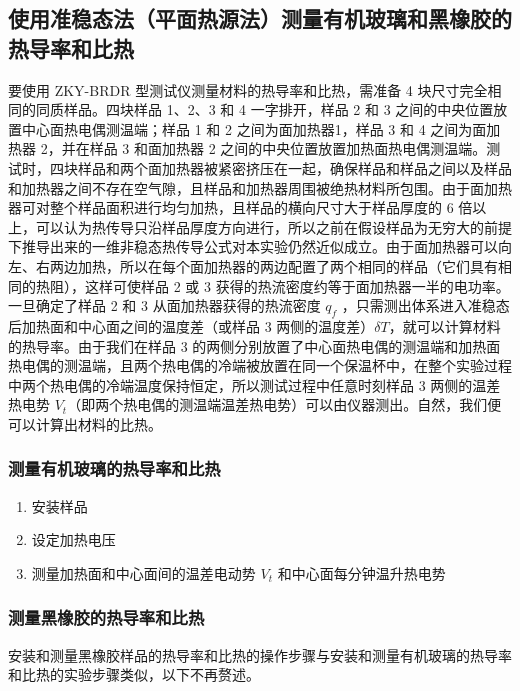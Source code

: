     \subsection{使用准稳态法（平面热源法）测量有机玻璃和黑橡胶的热导率和比热}
        要使用 ZKY-BRDR 型测试仪测量材料的热导率和比热，需准备 4 块尺寸完全相同的同质样品。四块样品 1、2、3 和 4 一字排开，样品 2 和 3 之间的中央位置放置中心面热电偶测温端；样品 1 和 2 之间为面加热器1，样品 3 和 4 之间为面加热器 2，并在样品 3 和面加热器 2 之间的中央位置放置加热面热电偶测温端。测试时，四块样品和两个面加热器被紧密挤压在一起，确保样品和样品之间以及样品和加热器之间不存在空气隙，且样品和加热器周围被绝热材料所包围。由于面加热器可对整个样品面积进行均匀加热，且样品的横向尺寸大于样品厚度的 6 倍以上，可以认为热传导只沿样品厚度方向进行，所以之前在假设样品为无穷大的前提下推导出来的一维非稳态热传导公式对本实验仍然近似成立。由于面加热器可以向左、右两边加热，所以在每个面加热器的两边配置了两个相同的样品（它们具有相同的热阻），这样可使样品 2 或 3 获得的热流密度约等于面加热器一半的电功率。一旦确定了样品 2 和 3 从面加热器获得的热流密度 $q_f$ ，只需测出体系进入准稳态后加热面和中心面之间的温度差（或样品 3 两侧的温度差）$\delta T$，就可以计算材料的热导率。由于我们在样品 3 的两侧分别放置了中心面热电偶的测温端和加热面热电偶的测温端，且两个热电偶的冷端被放置在同一个保温杯中，在整个实验过程中两个热电偶的冷端温度保持恒定，所以测试过程中任意时刻样品 3 两侧的温差热电势 $V_t$（即两个热电偶的测温端温差热电势）可以由仪器测出。自然，我们便可以计算出材料的比热。
        \subsubsection{测量有机玻璃的热导率和比热}
        \begin{enumerate}
            \item 安装样品
            \item 设定加热电压
            \item 测量加热面和中心面间的温差电动势 $V_t$ 和中心面每分钟温升热电势
        \end{enumerate}
        \subsubsection{测量黑橡胶的热导率和比热}
        安装和测量黑橡胶样品的热导率和比热的操作步骤与安装和测量有机玻璃的热导率和比热的实验步骤类似，以下不再赘述。
